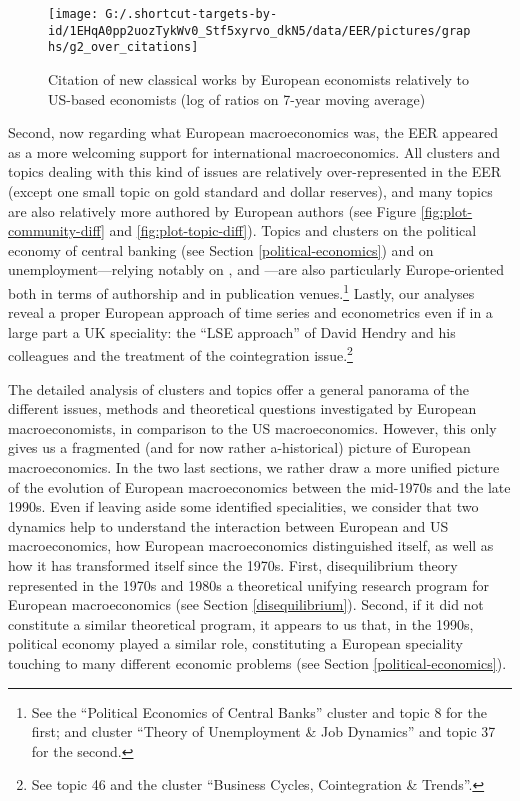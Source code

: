 \documentclass[]{elsarticle} %
\begin{document}
\begin{figure}[h]

{\centering \texttt{[image: G:/.shortcut-targets-by-id/1EHqA0pp2uozTykWv0\_Stf5xyrvo\_dkN5/data/EER/pictures/graphs/g2\_over\_citations]} 

}

\caption{Citation of new classical works by European economists relatively to US-based economists (log of ratios on 7-year moving average)}\label{fig:plot-new-classical}
\end{figure}

Second, now regarding what European macroeconomics was, the EER appeared
as a more welcoming support for international macroeconomics. All
clusters and topics dealing with this kind of issues are relatively
over-represented in the EER (except one small topic on gold standard and
dollar reserves), and many topics are also relatively more authored by
European authors (see Figure \ref{fig:plot-community-diff} and
\ref{fig:plot-topic-diff}). Topics and clusters on the political economy
of central banking (see Section \ref{political-economics}) and on
unemployment---relying notably on \citet{pissarides1990},
\citet{mortensen1994} and \citet{layard1991a}---are also particularly
Europe-oriented both in terms of authorship and in publication
venues.\footnote{See the ``Political Economics of Central Banks''
  cluster and topic 8 for the first; and cluster ``Theory of
  Unemployment \& Job Dynamics'' and topic 37 for the second.} Lastly,
our analyses reveal a proper European approach of time series and
econometrics even if in a large part a UK speciality: the ``LSE
approach'' of David Hendry and his colleagues \citep[chapter
4]{qin2013a} and the treatment of the cointegration issue.\footnote{See
  topic 46 and the cluster ``Business Cycles, Cointegration \& Trends''.}

The detailed analysis of clusters and topics offer a general panorama of
the different issues, methods and theoretical questions investigated by
European macroeconomists, in comparison to the US macroeconomics.
However, this only gives us a fragmented (and for now rather
a-historical) picture of European macroeconomics. In the two last
sections, we rather draw a more unified picture of the evolution of
European macroeconomics between the mid-1970s and the late 1990s. Even
if leaving aside some identified specialities, we consider that two
dynamics help to understand the interaction between European and US
macroeconomics, how European macroeconomics distinguished itself, as
well as how it has transformed itself since the 1970s. First,
disequilibrium theory represented in the 1970s and 1980s a theoretical
unifying research program for European macroeconomics (see Section
\ref{disequilibrium}). Second, if it did not constitute a similar
theoretical program, it appears to us that, in the 1990s, political
economy played a similar role, constituting a European speciality
touching to many different economic problems (see Section
\ref{political-economics}).
\end{document}
